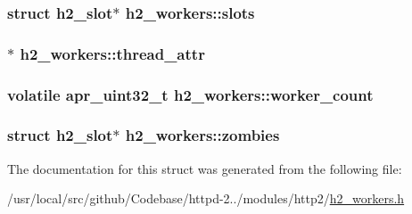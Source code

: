 \subsubsection[{\texorpdfstring{slots}{slots}}]{\setlength{\rightskip}{0pt plus 5cm}struct {\bf h2\+\_\+slot}$\ast$ h2\+\_\+workers\+::slots}\hypertarget{structh2__workers_a0864d31736bec5780751ec52a6f5798b}{}\label{structh2__workers_a0864d31736bec5780751ec52a6f5798b}
\subsubsection[{\texorpdfstring{thread\+\_\+attr}{thread_attr}}]{$\ast$ h2\+\_\+workers\+::thread\+\_\+attr}\hypertarget{structh2__workers_a8fc62165a55dd338d37bd24778e96f1f}{}\label{structh2__workers_a8fc62165a55dd338d37bd24778e96f1f}
\subsubsection[{\texorpdfstring{worker\+\_\+count}{worker_count}}]{\setlength{\rightskip}{0pt plus 5cm}volatile {\bf apr\+\_\+uint32\+\_\+t} h2\+\_\+workers\+::worker\+\_\+count}\hypertarget{structh2__workers_a9f9fcece7bbf08f65ab1aac955310d75}{}\label{structh2__workers_a9f9fcece7bbf08f65ab1aac955310d75}
\subsubsection[{\texorpdfstring{zombies}{zombies}}]{\setlength{\rightskip}{0pt plus 5cm}struct {\bf h2\+\_\+slot}$\ast$ h2\+\_\+workers\+::zombies}\hypertarget{structh2__workers_ad89027960968f58c4276e95c68eb70c5}{}\label{structh2__workers_ad89027960968f58c4276e95c68eb70c5}


The documentation for this struct was generated from the following file\+:\begin{DoxyCompactItemize}
\item 
/usr/local/src/github/\+Codebase/httpd-\/2../modules/http2/\hyperlink{h2__workers_8h}{h2\+\_\+workers.\+h}\end{DoxyCompactItemize}
